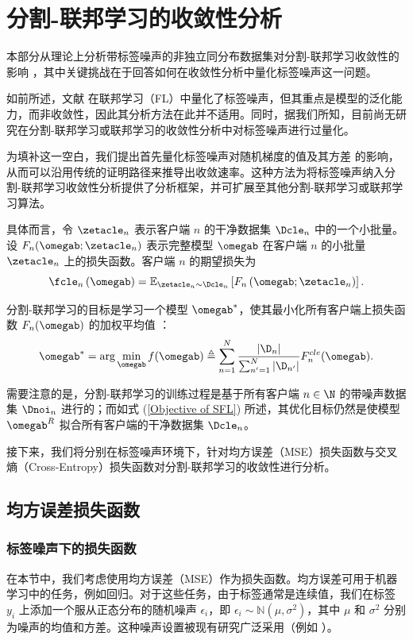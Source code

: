 \section{分割-联邦学习的收敛性分析}
本部分从理论上分析带标签噪声的非独立同分布数据集对分割-联邦学习收敛性的影响 ，其中关键挑战在于回答如何在收敛性分析中量化标签噪声这一问题。



如前所述，文献\cite{ke2023impact} 在联邦学习（FL）中量化了标签噪声，但其重点是模型的泛化能力，而非收敛性，因此其分析方法在此并不适用。同时，据我们所知，目前尚无研究在分割-联邦学习或联邦学习的收敛性分析中对标签噪声进行过量化。

为填补这一空白，我们提出首先量化标签噪声对随机梯度的值及其方差 的影响，从而可以沿用传统的证明路径来推导出收敛速率。这种方法为将标签噪声纳入分割-联邦学习收敛性分析提供了分析框架，并可扩展至其他分割-联邦学习或联邦学习算法。

具体而言，令 $\zetacle_n$ 表示客户端 $n$ 的干净数据集 $\Dcle_n$ 中的一个小批量。设 $F_n(\omegab;\zetacle_n)$ 表示完整模型 $\omegab$ 在客户端 $n$ 的小批量 $\zetacle_n$ 上的损失函数。客户端 $n$ 的期望损失为  
\begin{equation}\label{eq:exp-fn}
\fcle_n\left(\omegab\right)=\mathbb{E}_{\zetacle_n\sim \Dcle_n}\left[F_n\left(\omegab;\zetacle_n\right)\right].
\end{equation}

分割-联邦学习的目标是学习一个模型 $\omegab^*$，使其最小化所有客户端上损失函数 $F_{n}(\omegab)$ 的加权平均值 \cite{b8}：
\begin{equation}\label{Objective of SFL}
\omegab^* =\arg \min_{\omegab}f(\omegab)\triangleq \sum_{n=1}^{N}\frac{|\D_n|}{\sum_{n'=1}^{N}|\D_{n'}|}F^{cle}_{n}(\omegab).
\end{equation}

需要注意的是，分割-联邦学习的训练过程是基于所有客户端 $n\in\N$ 的带噪声数据集 $\Dnoi_n$ 进行的；而如式 (\ref{Objective of SFL}) 所述，其优化目标仍然是使模型 $\omegab^R$ 拟合所有客户端的干净数据集 $\Dcle_n$。

接下来，我们将分别在标签噪声环境下，针对均方误差（MSE）损失函数与交叉熵（Cross-Entropy）损失函数对分割-联邦学习的收敛性进行分析。

\subsection{均方误差损失函数}\label{subsec:mse}
\subsubsection{标签噪声下的损失函数}
在本节中，我们考虑使用均方误差（MSE）作为损失函数。均方误差可用于机器学习中的任务，例如回归。对于这些任务，由于标签通常是连续值，我们在标签 $y_i$ 上添加一个服从正态分布的随机噪声 $\epsilon_i$，即 $\epsilon_i \sim \mathbb{N}(\mu, \sigma^2)$，其中 $\mu$ 和 $\sigma^2$ 分别为噪声的均值和方差。这种噪声设置被现有研究广泛采用（例如 \cite{frenay2013classification}）。

